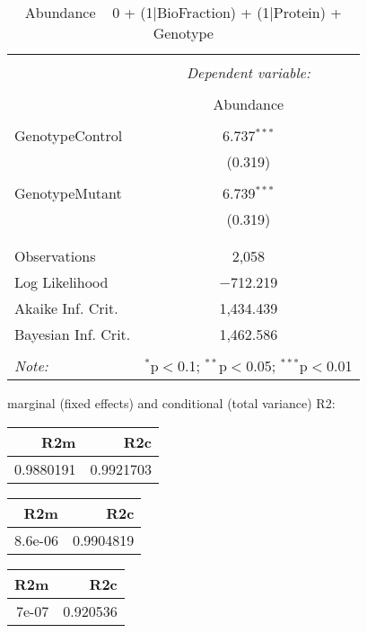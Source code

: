 \documentclass[11pt]{report}
\begin{document}
\begin{table}[!htbp] \centering 
  \caption{Abundance ~ 0 + (1|BioFraction) + (1|Protein) + Genotype} 
  \label{} 
\begin{tabular}{@{\extracolsep{5pt}}lc} 
\\[-1.8ex]\hline 
\hline \\[-1.8ex] 
 & \multicolumn{1}{c}{\textit{Dependent variable:}} \\ 
\cline{2-2} 
\\[-1.8ex] & Abundance \\ 
\hline \\[-1.8ex] 
 GenotypeControl & 6.737$^{***}$ \\ 
  & (0.319) \\ 
  & \\ 
 GenotypeMutant & 6.739$^{***}$ \\ 
  & (0.319) \\ 
  & \\ 
\hline \\[-1.8ex] 
Observations & 2,058 \\ 
Log Likelihood & $-$712.219 \\ 
Akaike Inf. Crit. & 1,434.439 \\ 
Bayesian Inf. Crit. & 1,462.586 \\ 
\hline 
\hline \\[-1.8ex] 
\textit{Note:}  & \multicolumn{1}{r}{$^{*}$p$<$0.1; $^{**}$p$<$0.05; $^{***}$p$<$0.01} \\ 
\end{tabular} 
\end{table} 
marginal (fixed effects) and conditional (total variance) R2:

\begin{tabular}{r|r}
\hline
R2m & R2c\\
\hline
0.9880191 & 0.9921703\\
\hline
\end{tabular}

\begin{tabular}{r|r}
\hline
R2m & R2c\\
\hline
8.6e-06 & 0.9904819\\
\hline
\end{tabular}

\begin{tabular}{r|r}
\hline
R2m & R2c\\
\hline
7e-07 & 0.920536\\
\hline
\end{tabular}
\end{document}
